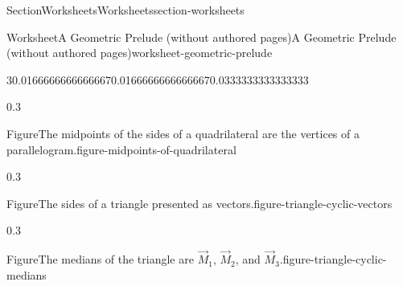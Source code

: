 \documentclass[oneside,10pt,]{article}
\numberwithin{equation}{section}
\begin{document}
\begin{sectionptx}{Section}{Worksheets}{}{Worksheets}{}{}{section-worksheets}
\begin{worksheet-subsection}{Worksheet}{A Geometric Prelude (without authored pages)}{}{A Geometric Prelude (without authored pages)}{}{}{worksheet-geometric-prelude}
\begin{introduction}{}
\begin{sidebyside}{3}{0.0166666666666667}{0.0166666666666667}{0.0333333333333333}%
\begin{sbspanel}{0.3}%
\begin{panelfigureptx}{Figure}{The midpoints of the sides of a quadrilateral are the vertices of a parallelogram.}{figure-midpoints-of-quadrilateral}{}%
\noindent{}%
\tcblower
\end{panelfigureptx}%
\end{sbspanel}%
\begin{sbspanel}{0.3}%
\begin{panelfigureptx}{Figure}{The sides of a triangle presented as vectors.}{figure-triangle-cyclic-vectors}{}%
\noindent{}%
\tcblower
\end{panelfigureptx}%
\end{sbspanel}%
\begin{sbspanel}{0.3}%
\begin{panelfigureptx}{Figure}{The medians of the triangle are \(\vec{M}_1\), \(\vec{M}_2\), and \(\vec{M}_3\).}{figure-triangle-cyclic-medians}{}%
\noindent\resizebox{\linewidth}{!}{%
\begin{tikzpicture}[xscale=1.5, yscale=1.5]

\end{tikzpicture}}
\end{panelfigureptx}
\end{sbspanel}
\end{sidebyside}
\end{introduction}
\end{worksheet-subsection}
\end{sectionptx}
\end{document}
